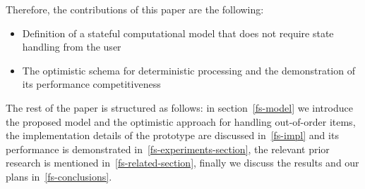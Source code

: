 Therefore, the contributions of this paper are the following:

\begin {itemize}
\item Definition of a stateful computational model that does not require state handling from the user
\item The optimistic schema for deterministic processing and the demonstration of its performance competitiveness
\end {itemize}

The rest of the paper is structured as follows: in section~\ref{fs-model} we introduce the proposed model and the optimistic approach for handling out-of-order items, the implementation details of the prototype are discussed in~\ref{fs-impl} and its performance is demonstrated in~\ref{fs-experiments-section}, the relevant prior research is mentioned in~\ref{fs-related-section}, finally we discuss the results and our plans in~\ref{fs-conclusions}.

\endinput
